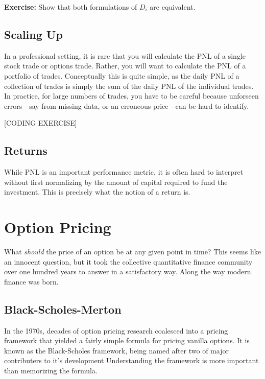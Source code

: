\documentclass[11pt,]{krantz}
\begin{document}
\textbf{Exercise:} Show that both formulations of \(D_{i}\) are equivalent.

\section{Scaling Up}\label{scaling-up}

In a professional setting, it is rare that you will calculate the PNL of a single stock trade or options trade. Rather, you will want to calculate the PNL of a portfolio of trades. Conceptually this is quite simple, as the daily PNL of a collection of trades is simply the sum of the daily PNL of the individual trades. In practice, for large numbers of trades, you have to be careful because unforseen errors - say from missing data, or an erroneous price - can be hard to identify.

{[}CODING EXERCISE{]}

\section{Returns}\label{returns}

While PNL is an important performance metric, it is often hard to interpret without first normalizing by the amount of capital required to fund the investment. This is precisely what the notion of a return is.

\chapter{Option Pricing}\label{option-pricing}

What \emph{should} the price of an option be at any given point in time? This seems like an innocent question, but it took the collective quantitative finance community over one hundred years to answer in a satisfactory way. Along the way modern finance was born.

\section{Black-Scholes-Merton}\label{black-scholes-merton}

In the 1970s, decades of option pricing research coalesced into a pricing framework that yielded a fairly simple formula for pricing vanilla options. It is known as the Black-Scholes framework, being named after two of major contributers to it's development Understanding the framework is more important than memorizing the formula.
\end{document}

